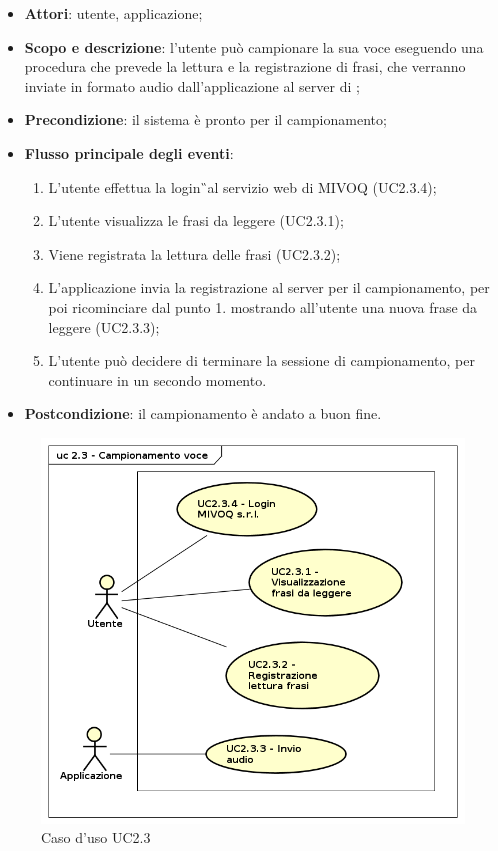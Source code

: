 \begin{itemize}
\item \textbf{Attori}: utente, applicazione;
\item \textbf{Scopo e descrizione}: l'utente può campionare la sua voce  eseguendo una procedura che prevede la lettura e la registrazione di frasi, che verranno inviate in formato audio dall'applicazione al server di \AZIENDA;
\item \textbf{Precondizione}: il sistema è pronto per il campionamento;
\item \textbf{Flusso principale degli eventi}:
\begin{enumerate}
\item L'utente effettua la login\G\ al servizio web di MIVOQ (UC2.3.4);
\item L'utente visualizza le frasi da leggere (UC2.3.1);
\item Viene registrata la lettura delle frasi (UC2.3.2);
\item L'applicazione invia la registrazione al server per il campionamento, per poi ricominciare dal punto 1. mostrando all'utente una nuova frase da leggere (UC2.3.3);
\item L'utente può decidere di terminare la sessione di campionamento, per continuare in un secondo momento.
\end{enumerate}
\item \textbf{Postcondizione}: il campionamento è andato a buon fine.
\end{itemize}
\begin{figure}[htbp]
\centering
\includegraphics[scale=0.5]{immagini/uc2_3_campionamento_voce.png}
\captionsetup{labelfont=bf}
\caption{Caso d'uso UC2.3}
\end{figure}
\newpage

